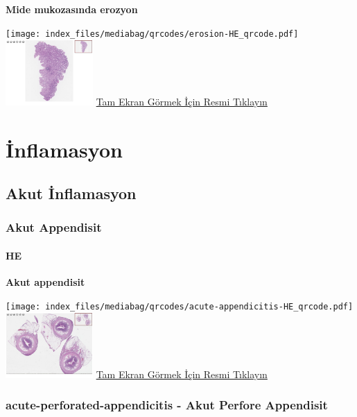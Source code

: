 \documentclass[
  letterpaper,
  DIV=11,
  numbers=noendperiod]{scrreprt}
\begin{document}
\textbf{Mide mukozasında erozyon}

\texttt{[image: index\_files/mediabag/qrcodes/erosion-HE\_qrcode.pdf]}
\href{https://images.patolojiatlasi.com/erosion/HE.html}{\includegraphics[width=0.25\textwidth,height=\textheight]{./screenshots/thumbnail_erosion.png}}
\href{https://images.patolojiatlasi.com/erosion/HE.html}{Tam Ekran
Görmek İçin Resmi Tıklayın}

\part{İnflamasyon}

\chapter{Akut İnflamasyon}\label{sec-akut-inflamasyon}

\section{Akut Appendisit}\label{sec-akut-appendisit}

\subsection{HE}\label{he-4}

\textbf{Akut appendisit}

\texttt{[image: index\_files/mediabag/qrcodes/acute-appendicitis-HE\_qrcode.pdf]}
\href{https://images.patolojiatlasi.com/acute-appendicitis/HE.html}{\includegraphics[width=0.25\textwidth,height=\textheight]{./screenshots/thumbnail_acute-appendicitis.png}}
\href{https://images.patolojiatlasi.com/acute-appendicitis/HE.html}{Tam
Ekran Görmek İçin Resmi Tıklayın}

\section{acute-perforated-appendicitis - Akut Perfore
Appendisit}\label{sec-acute-perforated-appendicitis}
\end{document}
